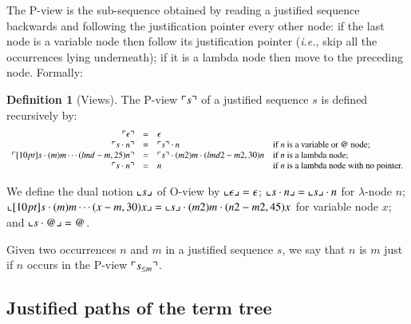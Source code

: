 \documentclass{elsarticle}
\makeatletter
\theoremstyle{plain}
\theoremstyle{definition}
\newtheorem{definition}{Definition}[section]
\theoremstyle{remark}
\renewcommand\ie{{\it i.e.\@\xspace}}
\makeatother
\begin{document}
The P-view is the sub-sequence obtained by reading a justified sequence backwards and following the justification pointer every other node: if the last node is a variable node then follow its justification pointer (\ie, skip all the occurrences lying underneath); if it is a lambda node then move to the preceding node. Formally:
\begin{definition}[Views]
\label{def:views}
The P-view $\ulcorner s \urcorner$ of a justified sequence $s$ is defined recursively by:
$$\begin{array}{rcll}
 \pview{\epsilon} &=&  \epsilon \\
 \pview{s \cdot n }  &=&  \pview{s} \cdot n
    & \mbox{if $n$ is a variable or $@$ node;}
    \\
 \pview{\Pstr[10pt]{ s \cdot (m){m} \cdots (lmd-m,25){n}}} &=&
        \Pstr{ \pview{s} \cdot (m2){m} \cdot (lmd2-m2,30){n} }
    & \mbox{if $n$ is a lambda node;}
    \\
 \pview{s \cdot n }  &=&  n & \mbox{if $n$ is a lambda node with no pointer.}
\end{array}$$

We define the dual notion $\llcorner s \lrcorner$ of O-view by
$\llcorner \epsilon \lrcorner = \epsilon$;
$\llcorner s \cdot n  \lrcorner  =  \llcorner s \lrcorner \cdot n$ for $\lambda$-node $n$;
$\oview{\Pstr[10pt]{s \cdot (m){m} \cdots (x-m,30){x}}}= \Pstr{ \oview{s} \cdot (m2){m} \cdot (n2-m2,45){x} }$ for variable node $x$; and $\llcorner s \cdot @  \lrcorner = @$.

\end{definition}

Given two occurrences $n$ and $m$ in a justified sequence $s$, we say that $n$ is  $m$ just if $n$ occurs in the P-view $\ulcorner s_{\leq m} \urcorner$.

\subsection{Justified paths of the term tree}
\end{document}
